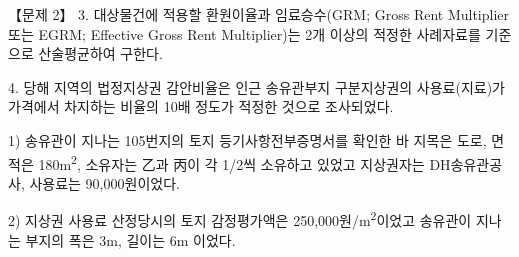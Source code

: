 \begin{longquestion}{【문제 2】}
3. 대상물건에 적용할 환원이율과 임료승수(GRM; Gross Rent Multiplier 또는 EGRM; Effective Gross Rent Multiplier)는 2개 이상의 적정한 사례자료를 기준으로 산술평균하여 구한다. \par
4. 당해 지역의 법정지상권 감안비율은 인근 송유관부지 구분지상권의 사용료(지료)가 가격에서 차지하는 비율의 10배 정도가 적정한 것으로 조사되었다. \par
1) 송유관이 지나는 105번지의 토지 등기사항전부증명서를 확인한 바 지목은 도로, 면적은 180m\textsuperscript{2}, 소유자는 乙과 丙이 각 1/2씩 소유하고 있었고 지상권자는 DH송유관공사, 사용료는 90,000원이었다. \par
2) 지상권 사용료 산정당시의 토지 감정평가액은 250,000원/m\textsuperscript{2}이었고 송유관이 지나는 부지의 폭은 3m, 길이는 6m 이었다. \par
\end{longquestion}
